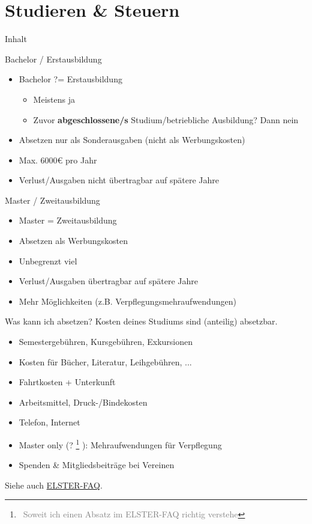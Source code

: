 \documentclass{beamer}
\let\oldfootnote\footnote
\renewcommand{\footnote}[1]
{%
	\oldfootnote
	{
		\tiny
		\textcolor{gray}{\ #1}
	}%
}
\begin{document}
	\section{Studieren \& Steuern}
	
		\begin{frame}[t]{Inhalt}
		\end{frame}
	
		\begin{frame}{Bachelor / Erstausbildung}
			\begin{itemize}
				\item Bachelor ?= Erstausbildung
				\begin{itemize}
					\item Meistens ja
					\item Zuvor \textbf{abgeschlossene/s} Studium/betriebliche Ausbildung? Dann nein
				\end{itemize}
				\item Absetzen nur als Sonderausgaben (nicht als Werbungskosten)
				\item Max. 6000€ pro Jahr
				\item Verlust/Ausgaben nicht übertragbar auf spätere Jahre
			\end{itemize}
		\end{frame}
	
		\begin{frame}{Master / Zweitausbildung}
			\begin{itemize}
				\item Master = Zweitausbildung
				\item Absetzen als Werbungskosten
				\item Unbegrenzt viel
				\item Verlust/Ausgaben übertragbar auf spätere Jahre
				\item Mehr Möglichkeiten (z.B. Verpflegungsmehraufwendungen)
			\end{itemize}
		\end{frame}
	
		\begin{frame}{Was kann ich absetzen?}
			Kosten deines Studiums sind (anteilig) absetzbar.\n
			\begin{itemize}
				\item Semestergebühren, Kursgebühren, Exkursionen
				\item Kosten für Bücher, Literatur, Leihgebühren, ...
				\item Fahrtkosten + Unterkunft
				\item Arbeitsmittel, Druck-/Bindekosten
				\item Telefon, Internet
				\item Master only (?\footnote{Soweit ich einen Absatz im ELSTER-FAQ richtig verstehe}): Mehraufwendungen für Verpflegung
				\item Spenden \& Mitgliedsbeiträge bei Vereinen
			\end{itemize}\n
			Siehe auch \href{https://www.elster.de/eportal/helpGlobal?themaGlobal=help_est_ufa_10_2020}{ELSTER-FAQ}.
		\end{frame}
	
\end{document}
